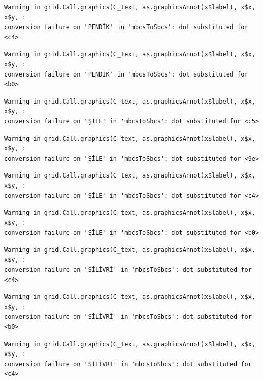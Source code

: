 \documentclass[
  11pt,
  a4paper,
  DIV=11,
  numbers=noendperiod]{scrartcl}
\begin{document}
\begin{verbatim}
Warning in grid.Call.graphics(C_text, as.graphicsAnnot(x$label), x$x, x$y, :
conversion failure on 'PENDİK' in 'mbcsToSbcs': dot substituted for <c4>
\end{verbatim}

\begin{verbatim}
Warning in grid.Call.graphics(C_text, as.graphicsAnnot(x$label), x$x, x$y, :
conversion failure on 'PENDİK' in 'mbcsToSbcs': dot substituted for <b0>
\end{verbatim}

\begin{verbatim}
Warning in grid.Call.graphics(C_text, as.graphicsAnnot(x$label), x$x, x$y, :
conversion failure on 'ŞİLE' in 'mbcsToSbcs': dot substituted for <c5>
\end{verbatim}

\begin{verbatim}
Warning in grid.Call.graphics(C_text, as.graphicsAnnot(x$label), x$x, x$y, :
conversion failure on 'ŞİLE' in 'mbcsToSbcs': dot substituted for <9e>
\end{verbatim}

\begin{verbatim}
Warning in grid.Call.graphics(C_text, as.graphicsAnnot(x$label), x$x, x$y, :
conversion failure on 'ŞİLE' in 'mbcsToSbcs': dot substituted for <c4>
\end{verbatim}

\begin{verbatim}
Warning in grid.Call.graphics(C_text, as.graphicsAnnot(x$label), x$x, x$y, :
conversion failure on 'ŞİLE' in 'mbcsToSbcs': dot substituted for <b0>
\end{verbatim}

\begin{verbatim}
Warning in grid.Call.graphics(C_text, as.graphicsAnnot(x$label), x$x, x$y, :
conversion failure on 'SİLİVRİ' in 'mbcsToSbcs': dot substituted for <c4>
\end{verbatim}

\begin{verbatim}
Warning in grid.Call.graphics(C_text, as.graphicsAnnot(x$label), x$x, x$y, :
conversion failure on 'SİLİVRİ' in 'mbcsToSbcs': dot substituted for <b0>
\end{verbatim}

\begin{verbatim}
Warning in grid.Call.graphics(C_text, as.graphicsAnnot(x$label), x$x, x$y, :
conversion failure on 'SİLİVRİ' in 'mbcsToSbcs': dot substituted for <c4>
\end{verbatim}
\end{document}
